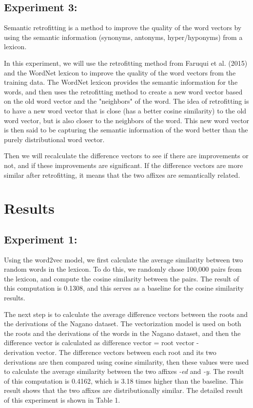 \documentclass[12pt]{article}
\begin{document}
\subsection{Experiment 3:}
    Semantic retrofitting is a method to improve the quality of the word vectors by using the semantic information (synonyms, antonyms, hyper/hyponyms) from a lexicon. 

    In this experiment, we will use the retrofitting method from Faruqui et al. (2015) and the WordNet lexicon to improve the quality of the word vectors from the training data. The WordNet lexicon provides the semantic information for the words, and then uses the retrofitting method to create a new word vector based on the old word vector and the "neighbors" of the word. The idea of retrofitting is to have a new word vector that is close (has a better cosine similarity) to the old word vector, but is also closer to the neighbors of the word. This new word vector is then said to be capturing the semantic information of the word better than the purely distributional word vector.

    Then we will recalculate the difference vectors to see if there are improvements or not, and if these improvements are significant. If the difference vectors are more similar after retrofitting, it means that the two affixes are semantically related.

\section{Results}
    \subsection{Experiment 1:}
    Using the word2vec model, we first calculate the average similarity between two random words in the lexicon. To do this, we randomly chose 100,000 pairs from the lexicon, and compute the cosine similarity between the pairs. The result of this computation is 0.1308, and this serves as a baseline for the cosine similarity results. 

    The next step is to calculate the average difference vectors between the roots and the derivations of the Nagano dataset. The vectorization model is used on both the roots and the derivations of the words in the Nagano dataset, and then the difference vector is calculated as $\text{difference vector}$ = $\text{root vector}$ - $\text{derivation vector}$. The difference vectors between each root and its two derivations are then compared using cosine similarity, then these values were used to calculate the average similarity between the two affixes \emph{-ed} and \emph{-y}. The result of this computation is 0.4162, which is 3.18 times higher than the baseline. This result shows that the two affixes are distributionally similar. The detailed result of this experiment is shown in Table 1.
\end{document}
